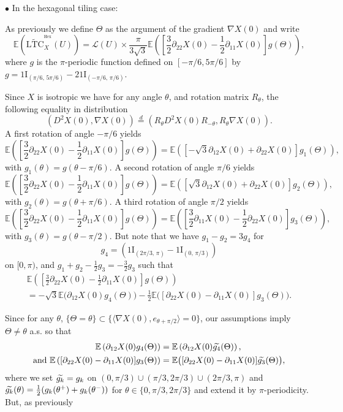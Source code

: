 \documentclass[10pt]{amsart}
\theoremstyle{definition}\newtheorem{defi}[theo]{Definition}\newtheorem{rema}[theo]{Remark}\newtheorem{exam}[theo]{Example}\newtheorem{exem}[theo]{Example}\newtheorem{nota}[theo]{Notation}
\newcommand{\E}{\mathbb{E}}
\newcommand{\ind}{{1\!\!\mathrm{I}}}
\DeclareMathOperator{\Hex}{Hex}
\newcommand{\tLTC}{\widetilde{\mathrm{LTC}}}
\newcommand{\calL}{\mathcal{L}}
\let\oldtilde\tilde
\renewcommand*{\tilde}[1]{\mathchoice{\widetilde{#1}}{\widetilde{#1}}{\oldtilde{#1}}{\oldtilde{#1}}}
\begin{document}
$\bullet$ In the hexagonal tiling case:

As previously we define $\Theta$ as the argument of the gradient $\nabla X(0)$ and write
\[
\E\left(\tLTC^{^{\Hex}}_{X}(U)\right)=\calL(U)\times
\frac{\pi}{3\sqrt{3}}\E\left(\left[\frac{3}{2}\partial_{22}X(0)
-\frac{1}{2}\partial_{11}X(0)\right]g(\Theta)\right),
\]
where $g$ is the $\pi$-periodic function defined on $[-\pi/6,5\pi/6]$ by $g=\ind_{(\pi/6,\,5\pi/6)}-2\ind_{(-\pi/6,\,\pi/6)}$.

Since $X$ is isotropic we have for any angle $\theta$, and rotation matrix $R_\theta$, the following equality in distribution
\[
\left(D^2X(0), \nabla X(0)\right)\stackrel{d}{=}\left(R_\theta D^2X(0) R_{-\theta}, R_\theta \nabla X(0)\right).
\]
A first rotation of angle $-\pi/6$ yields
\[
\E\left(\left[\frac{3}{2}\partial_{22}X(0)
-\frac{1}{2}\partial_{11}X(0)\right]g(\Theta)\right)=\E\left(\left[-\sqrt{3}\partial_{12}X(0)
+\partial_{22}X(0)\right]g_1(\Theta)\right),
\]
with $g_1(\theta)=g(\theta-\pi/6)$. A second rotation of angle $\pi/6$ yields
\[
\E\left(\left[\frac{3}{2}\partial_{22}X(0)
-\frac{1}{2}\partial_{11}X(0)\right]g(\Theta)\right)=\E\left(\left[\sqrt{3}\partial_{12}X(0)
+\partial_{22}X(0)\right]g_2(\Theta)\right),
\]
with $g_2(\theta)=g(\theta+\pi/6)$. A third rotation of angle $\pi/2$ yields
\[
\E\left(\left[\frac{3}{2}\partial_{22}X(0)
-\frac{1}{2}\partial_{11}X(0)\right]g(\Theta)\right)=\E\left(\left[\frac{3}{2}\partial_{11}X(0)
-\frac{1}{2}\partial_{22}X(0)\right]g_3(\Theta)\right),
\]
with $g_3(\theta)=g(\theta-\pi/2)$. But note that we have $g_1-g_2=3g_4$ for
\[
g_4=\left(\ind_{(2\pi/3,\,\pi)} -\ind_{(0,\,\pi/3)}\right)
\]
on $[0,\pi)$, and $g_1+g_2-\frac{1}{2}g_3=-\frac{3}{2}g_3$ such that
\begin{multline*}
\E\left(\left[\frac{3}{2}\partial_{22}X(0)
-\frac{1}{2}\partial_{11}X(0)\right]g(\Theta)\right)\\
=-\sqrt{3}\E\big(\partial_{12}X(0)g_4(\Theta)\big)-\frac{1}{2}
\E\big(\left[\partial_{22}X(0)-\partial_{11}X(0)\right]g_3(\Theta)\big).
\end{multline*}

Since for any $\theta$, $\{\Theta=\theta\}\subset \{\langle \nabla X(0),e_{\theta+\pi/2}\rangle =0\}$, our assumptions imply $\Theta \neq \theta$ a.s. so that
\begin{align*}
\E\left(\partial_{12}X(0)g_4(\Theta)\right) &=\E\left(\partial_{12}X(0)\tilde{g_4}(\Theta)\right),
\\
\text{and }
\E\left([\partial_{22}X(0)-\partial_{11}X(0)]g_3(\Theta)\right) &=\E\big([\partial_{22}X(0)-\partial_{11}X(0)]\tilde{g_3}(\Theta)\big),
\end{align*}
where we set $\tilde{g_k}=g_k$ on $(0,\pi/3)\cup (\pi/3,2\pi/3)\cup (2\pi/3,\pi)$ and $\tilde{g_k}(\theta)=\frac{1}{2}(g_k(\theta^+)+g_k(\theta^-))$ for $\theta\in \{0,\pi/3,2\pi/3\}$ and extend it by $\pi$-periodicity. But, as previously
\end{document}
